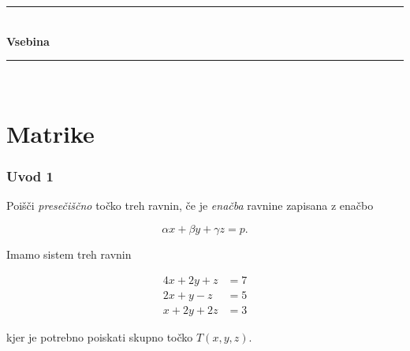 \documentclass[8pt,aspectratio=169]{beamer} %
\begin{document}
\setcounter{tocdepth}{1}
\begin{frame}[plain,noframenumbering,label=contentpage]
	\begin{center}
		\hspace*{0mm}\rule{130mm}{0.5mm}\\
		\vspace{1.5mm}%
		{\Huge \textbf{Vsebina}}\\
		\vspace{-1mm}%
		\hspace*{0mm}\rule{130mm}{0.5mm}
	\end{center}
	\vspace*{5mm}
	\begin{minipage}[t]{5mm}
		~
	\end{minipage}
	\hfill
	\begin{minipage}[t]{135mm}	
		\normalsize
		\tableofcontents[
		sectionstyle=show,
		subsectionstyle=show/show
		]
	\end{minipage}
	\vfill	
\end{frame}




\section{Matrike}
\setcounter{section}{1}

\begin{frame}[plain,noframenumbering,label=newsection]
	\vfill
	\begin{center}
		
		\vspace*{5mm}
		\textcolor{royalblue1}{\textbf{\insertsectionhead}}
	\end{center}
	\vfill
\end{frame}


\begin{frame}
	\frametitle{Uvod 1}
	
	 Poišči \emph{presečiščno} točko treh ravnin, če je \emph{enačba} ravnine zapisana z enačbo
	
	\[
	\alpha x + \beta y + \gamma z = p.
	\]
	
	 Imamo sistem treh ravnin
	
	\begin{equation} \label{eq:plane_system}
		\begin{split}
		4 x + 2 y + z & = 7\\
		2 x + y - z & = 5\\
		x + 2 y + 2 z & = 3
		\end{split}	
	\end{equation}
	
	kjer je potrebno poiskati skupno točko $T(x,y,z)$.
	
\end{frame}
\end{document}
